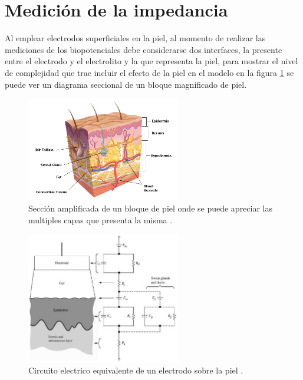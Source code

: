 \section{Medición de la impedancia}
Al emplear electrodos superficiales en la piel, al momento de realizar las mediciones de los biopotenciales debe considerarse dos interfaces, la presente entre el electrodo y el electrolito y la que representa la piel, para mostrar el nivel de complejidad que trae incluir el efecto de la piel en el modelo en la figura \ref{Imagen piel} se puede ver un diagrama seccional de un bloque magnificado de piel.

\begin{figure}[H]
  \centering
  \includegraphics[width=0.6\textwidth]{Capitulo_1/skindiagram.jpg}
  \caption{Sección amplificada de un bloque de piel onde se puede apreciar las multiples capas que presenta la misma \cite{iskin2015}.}
  \label{Imagen piel} 
\end{figure}



\begin{figure}[H]
  \centering
  \includegraphics[width=0.6\textwidth]{Capitulo_1/skindiagramcircuit.jpg}
  \caption{Circuito electrico equivalente de un electrodo sobre la piel \cite{webster2009medical}.}
  \label{circuito equivalente} 
\end{figure}

